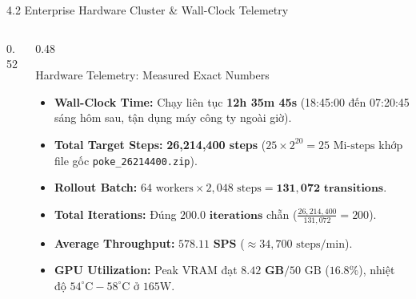 \documentclass[aspectratio=169, 10pt]{beamer}
\begin{document}
\begin{frame}{4.2 Enterprise Hardware Cluster \& Wall-Clock Telemetry}
\begin{columns}[c]
\begin{column}{0.52\textwidth}
    \end{column}
    \begin{column}{0.48\textwidth}
        \begin{block}{Hardware Telemetry: Measured Exact Numbers}
            \begin{itemize}\scriptsize
                \item \textbf{Wall-Clock Time:} Chạy liên tục \textbf{12h 35m 45s} (18:45:00 đến 07:20:45 sáng hôm sau, tận dụng máy công ty ngoài giờ).
                \item \textbf{Total Target Steps:} \textbf{26,214,400 steps} ($25 \times 2^{20} = 25\text{ Mi-steps}$ khớp file gốc \texttt{poke\_26214400.zip}).
                \item \textbf{Rollout Batch:} $64 \text{ workers} \times 2{,}048 \text{ steps} = \mathbf{131{,}072\text{ transitions}}$.
                \item \textbf{Total Iterations:} Đúng $\mathbf{200.0\text{ iterations}}$ chẵn ($\frac{26{,}214{,}400}{131{,}072} = 200$).
                \item \textbf{Average Throughput:} $\mathbf{578.11\text{ SPS}}$ ($\approx 34{,}700\text{ steps/min}$).
                \item \textbf{GPU Utilization:} Peak VRAM đạt $\mathbf{8.42\text{ GB}} / 50\text{ GB}$ ($16.8\%$), nhiệt độ $54^\circ\text{C}-58^\circ\text{C}$ ở $165\text{W}$.
            \end{itemize}
        \end{block}
    \end{column}
\end{columns}
\end{frame}
\end{document}
